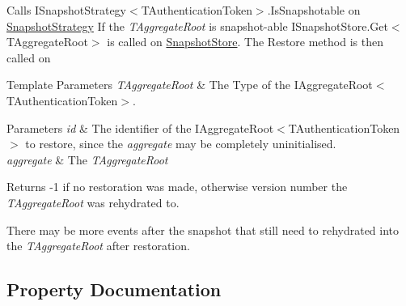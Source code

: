Calls I\+Snapshot\+Strategy$<$\+T\+Authentication\+Token$>$.\+Is\+Snapshotable on \hyperlink{classCqrs_1_1Akka_1_1Snapshots_1_1AkkaSnapshotRepository_ad230c1d7f2d70973cdf116b14fcd0ab0_ad230c1d7f2d70973cdf116b14fcd0ab0}{Snapshot\+Strategy} If the {\itshape T\+Aggregate\+Root}  is snapshot-\/able I\+Snapshot\+Store.\+Get$<$\+T\+Aggregate\+Root$>$ is called on \hyperlink{classCqrs_1_1Akka_1_1Snapshots_1_1AkkaSnapshotRepository_a83f16c1598f3df2a8889fdf5cab5dfb9_a83f16c1598f3df2a8889fdf5cab5dfb9}{Snapshot\+Store}. The Restore method is then called on 


\begin{DoxyTemplParams}{Template Parameters}
{\em T\+Aggregate\+Root} & The Type of the I\+Aggregate\+Root$<$\+T\+Authentication\+Token$>$.\\
\hline
\end{DoxyTemplParams}

\begin{DoxyParams}{Parameters}
{\em id} & The identifier of the I\+Aggregate\+Root$<$\+T\+Authentication\+Token$>$ to restore, since the {\itshape aggregate}  may be completely uninitialised.\\
\hline
{\em aggregate} & The {\itshape T\+Aggregate\+Root} \\
\hline
\end{DoxyParams}
\begin{DoxyReturn}{Returns}
-\/1 if no restoration was made, otherwise version number the {\itshape T\+Aggregate\+Root}  was rehydrated to.
\end{DoxyReturn}


There may be more events after the snapshot that still need to rehydrated into the {\itshape T\+Aggregate\+Root}  after restoration.

\subsection{Property Documentation}
\mbox{\label{classCqrs_1_1Akka_1_1Snapshots_1_1AkkaSnapshotRepository_a359251dfcca7e157ace7dac46bdf18ef_a359251dfcca7e157ace7dac46bdf18ef}} 
